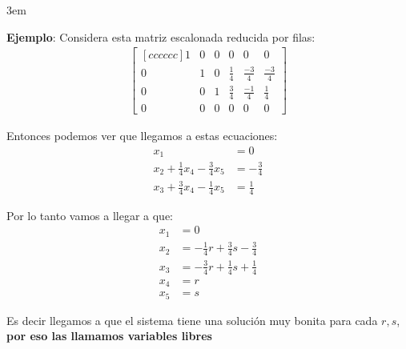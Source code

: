\documentclass[12pt, fleqn]{report}                             %
\newenvironment{SmallIndentation}[1][0.75em]                    %
        {\begin{adjustwidth}{#1}{}\begin{footnotesize}}             %
        {\end{footnotesize}\end{adjustwidth}}                       %
\theoremstyle{break}                                            %
\begin{document}
                \begin{SmallIndentation}[3em]
                    \textbf{Ejemplo}:
                    Considera esta matriz escalonada reducida por filas:
                    \begin{align*}
                        \begin{bmatrix}[c c c c c c]
                            1&0&0&0&0&0                                     \\
                            0&1&0&\frac{1}{4}&\frac{-3}{4}&\frac{-3}{4}     \\
                            0&0&1&\frac{3}{4}&\frac{-1}{4}&\frac{1}{4}      \\
                            0&0&0&0&0&0
                        \end{bmatrix}
                    \end{align*}

                    Entonces podemos ver que llegamos a estas ecuaciones:
                    \begin{align*}
                        x_1 &= 0                                                \\
                        x_2 + \frac{1}{4}x_4 - \frac{3}{4}x_5 &= -\frac{3}{4}   \\
                        x_3 + \frac{3}{4}x_4 - \frac{1}{4}x_5 &= \frac{1}{4}
                    \end{align*}

                    Por lo tanto vamos a llegar a que:
                    \begin{align*}
                        x_1 &= 0                                            \\
                        x_2 &= -\frac{1}{4}r + \frac{3}{4}s - \frac{3}{4}   \\
                        x_3 &= -\frac{3}{4}r + \frac{1}{4}s + \frac{1}{4}   \\
                        x_4 &= r                                            \\
                        x_5 &= s
                    \end{align*}  

                    Es decir llegamos a que el sistema tiene una solución
                    muy bonita para cada $r, s$, \textbf{por eso las llamamos
                    variables libres}
                
                \end{SmallIndentation}
                    
\end{document}

